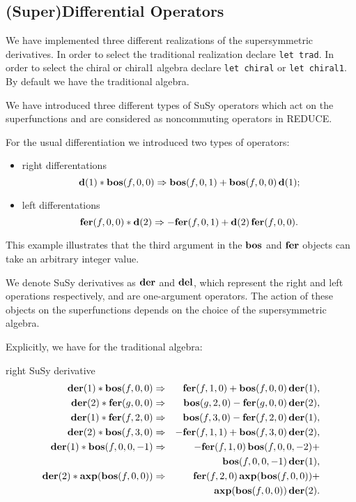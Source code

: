 {\subsection{(Super)Differential Operators}

We have implemented three different realizations of the supersymmetric
derivatives.  In order to select the traditional realization declare
\texttt{let trad}.  In order to select the chiral or chiral1 algebra
declare \texttt{let chiral} or \texttt{let chiral1}.  By default we
have the traditional algebra.

We have introduced three different types of SuSy operators which act
on the superfunctions and are considered as noncommuting operators in
REDUCE.

For the usual differentiation we introduced two types of operators:
\begin{itemize}
\item right differentations
  \begin{equation*}
    \mathbf{d}(1)*\mathbf{bos}(f,0,0) \Rightarrow  \mathbf{bos}(f,0,1) + \mathbf{bos}(f,0,0)\,\mathbf{d}(1);
  \end{equation*}
\item left differentations
  \begin{equation*}
    \mathbf{fer}(f,0,0)*\mathbf{d}(2) \Rightarrow -\mathbf{fer}(f,0,1) + \mathbf{d}(2)\,\mathbf{fer}(f,0,0).
  \end{equation*}
\end{itemize}
This example illustrates that the third argument in the $\mathbf{bos}$ and
$\mathbf{fer}$ objects can take an arbitrary integer value.

We denote SuSy derivatives as $\mathbf{der}$ and $\mathbf{del}$, which represent the
right and left operations respectively, and are one-argument
operators.  The action of these objects on the superfunctions depends
on the choice of the supersymmetric algebra.

Explicitly, we have for the traditional algebra:
\begin{description}
\item{right SuSy derivative}
  \begin{eqnarray*}
    \mathbf{der}(1)*\mathbf{bos}(f,0,0) &\Rightarrow&  \mathbf{fer}(f,1,0)+\mathbf{bos}(f,0,0)\,\mathbf{der}(1), \\
    \mathbf{der}(2)*\mathbf{fer}(g,0,0) &\Rightarrow&  \mathbf{bos}(g,2,0)-\mathbf{fer}(g,0,0)\,\mathbf{der}(2), \\
    \mathbf{der}(1)*\mathbf{fer}(f,2,0) &\Rightarrow&  \mathbf{bos}(f,3,0)-\mathbf{fer}(f,2,0)\,\mathbf{der}(1), \\
    \mathbf{der}(2)*\mathbf{bos}(f,3,0) &\Rightarrow& -\mathbf{fer}(f,1,1)+\mathbf{bos}(f,3,0)\,\mathbf{der}(2), \\
    \mathbf{der}(1)*\mathbf{bos}(f,0,0,-1) &\Rightarrow& -\mathbf{fer}(f,1,0)\,\mathbf{bos}(f,0,0,-2) + \\
    && \mathbf{bos}(f,0,0,-1)\,\mathbf{der}(1), \\
    \mathbf{der}(2)*\mathbf{axp}(\mathbf{bos}(f,0,0)) &\Rightarrow&
    \mathbf{fer}(f,2,0)\,\mathbf{axp}(\mathbf{bos}(f,0,0)) + \\
    && \mathbf{axp}(\mathbf{bos}(f,0,0))\,\mathbf{der}(2).
  \end{eqnarray*}


\end{description}}
